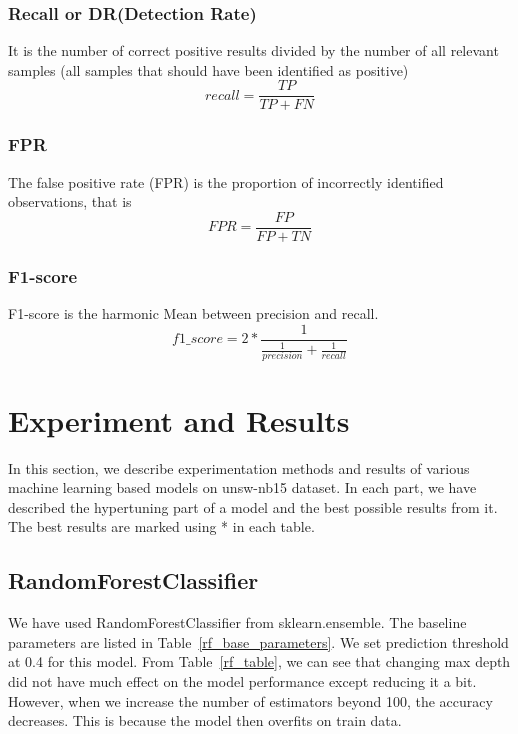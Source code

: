 \documentclass[14pt, conference]{IEEEtran}
\begin{document}
\subsubsection{Recall or DR(Detection Rate)}
It is the number of correct positive results divided by the number of all relevant samples (all samples that should have been identified as positive)
\begin{equation}
    recall = \frac{TP}{TP+FN}
\end{equation}

\subsubsection{FPR}
The false positive rate (FPR) is the proportion of incorrectly identified observations, that is 
\begin{equation}
    FPR = \frac{FP}{FP+TN}
\end{equation}

\subsubsection{F1-score}
F1-score is the harmonic Mean between precision and recall.
\begin{equation}
    f1\_score = 2 * \frac{1}{\frac{1}{precision}+ \frac{1}{recall}}
\end{equation}


\section{Experiment and Results \label{results}}
In this section, we describe experimentation methods and results of various machine learning based models on unsw-nb15 dataset. In each part, we have described the hypertuning part of a model and the best possible results from it. The best results are marked using * in each table.\\

\subsection{RandomForestClassifier}
We have used RandomForestClassifier from sklearn.ensemble. The baseline parameters are listed in Table~\ref{rf_base_parameters}. We set prediction threshold at 0.4 for this model. From Table~\ref{rf_table}, we can see that changing max depth did not have much effect on the model performance except reducing it a bit. However, when we increase the number of estimators beyond 100,  the accuracy decreases. This is because the model then overfits on train data. 
\end{document}
